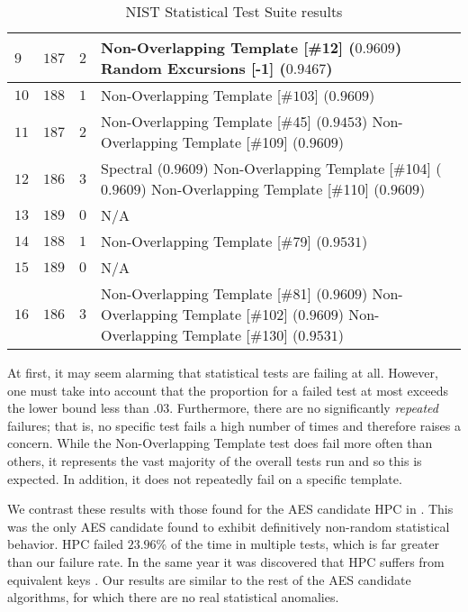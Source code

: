 \begin{table}[p]
\begin{tabular}{>{\centering\arraybackslash}m{1.6cm} |>{\centering\arraybackslash} m{2.5cm} |>{\centering\arraybackslash} m{3cm} | m{7cm}}
\hline
$9$ & $187$ & $2$ & 
Non-Overlapping Template [\#12] ($0.9609$) \newline
Random Excursions [-1] ($0.9467$) \\

\hline
$10$ & $188$ & $1$ & 
Non-Overlapping Template [\#$103$] ($0$.$9609$) \\

\hline
$11$ & $187$ & $2$ & 
Non-Overlapping Template [\#45] ($0.9453$) \newline
Non-Overlapping Template [\#109] ($0.9609$) \\

\hline
$12$ & $186$ & $3$ & 
Spectral ($0.9609$) \newline
Non-Overlapping Template [\#104] ($0.9609$) \newline
Non-Overlapping Template [\#110] ($0.9609$) \\

\hline
$13$ & $189$ & $0$ & 
N/A \\

\hline
$14$ & $188$ & $1$ & 
Non-Overlapping Template [\#79] ($0.9531$) \\

\hline
$15$ & $189$ & $0$ & 
N/A \\

\hline
$16$ & $186$ & $3$ & 
Non-Overlapping Template [\#81] ($0.9609$) \newline
Non-Overlapping Template [\#102] ($0.9609$) \newline
Non-Overlapping Template [\#130] ($0.9531$) \\
\end{tabular}
\caption{NIST Statistical Test Suite results}
\label{tab:PvalProportionResults}
\end{table}

At first, it may seem alarming that statistical tests are failing at all.
However, one must take into account that the proportion for a failed test at most exceeds the lower bound less than $.03$. 
Furthermore, there are no significantly \emph{repeated} failures; that is, no specific test fails a high number of times and therefore raises a concern.
While the Non-Overlapping Template test does fail more often than others, it represents the vast majority of the overall tests run and so this is expected.
In addition, it does not repeatedly fail on a specific template.

We contrast these results with those found for the AES candidate HPC in \cite{NIST1999_AES_STS_Testing}. 
This was the only AES candidate found to exhibit definitively non-random statistical behavior.
HPC failed $23.96\%$ of the time in multiple tests, which is far greater than our failure rate.
In the same year it was discovered that HPC suffers from equivalent keys \cite{DHalluin1999_HPC_EquivalentKeys}.
Our results are similar to the rest of the AES candidate algorithms, for which there are no real statistical anomalies.

